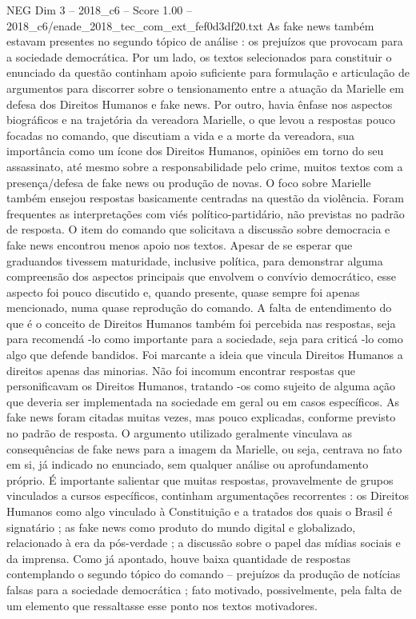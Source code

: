 \begin{textsample}{NEG Dim 3 – 2018\_c6 – Score 1.00 – 2018\_c6/enade\_2018\_tec\_com\_ext\_fef0d3df20.txt}
As fake news também estavam presentes no segundo tópico de análise : os prejuízos que provocam para a sociedade democrática.
Por um lado, os textos selecionados para constituir o enunciado da questão continham apoio suficiente para formulação e articulação de argumentos para discorrer sobre o tensionamento entre a atuação da Marielle em defesa dos Direitos Humanos e fake news.
Por outro, havia ênfase nos aspectos biográficos e na trajetória da vereadora Marielle, o que levou a respostas pouco focadas no comando, que discutiam a vida e a morte da vereadora, sua importância como um ícone dos Direitos Humanos, opiniões em torno do seu assassinato, até mesmo sobre a responsabilidade pelo crime, muitos textos com a presença/defesa de fake news ou produção de novas.
O foco sobre Marielle também ensejou respostas basicamente centradas na questão da violência.
Foram frequentes as interpretações com viés político-partidário, não previstas no padrão de resposta.
O item do comando que solicitava a discussão sobre democracia e fake news encontrou menos apoio nos textos.
Apesar de se esperar que graduandos tivessem maturidade, inclusive política, para demonstrar alguma compreensão dos aspectos principais que envolvem o convívio democrático, esse aspecto foi pouco discutido e, quando presente, quase sempre foi apenas mencionado, numa quase reprodução do comando.
A falta de entendimento do que é o conceito de Direitos Humanos também foi percebida nas respostas, seja para recomendá -lo como importante para a sociedade, seja para criticá -lo como algo que defende bandidos.
Foi marcante a ideia que vincula Direitos Humanos a direitos apenas das minorias.
Não foi incomum encontrar respostas que personificavam os Direitos Humanos, tratando -os como sujeito de alguma ação que deveria ser implementada na sociedade em geral ou em casos específicos.
As fake news foram citadas muitas vezes, mas pouco explicadas, conforme previsto no padrão de resposta.
O argumento utilizado geralmente vinculava as consequências de fake news para a imagem da Marielle, ou seja, centrava no fato em si, já indicado no enunciado, sem qualquer análise ou aprofundamento próprio.
É importante salientar que muitas respostas, provavelmente de grupos vinculados a cursos específicos, continham argumentações recorrentes : os Direitos Humanos como algo vinculado à Constituição e a tratados dos quais o Brasil é signatário ; as fake news como produto do mundo digital e globalizado, relacionado à era da pós-verdade ; a discussão sobre o papel das mídias sociais e da imprensa.
Como já apontado, houve baixa quantidade de respostas contemplando o segundo tópico do comando – prejuízos da produção de notícias falsas para a sociedade democrática ; fato motivado, possivelmente, pela falta de um elemento que ressaltasse esse ponto nos textos motivadores.

\end{textsample}
